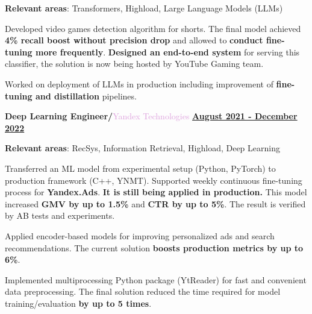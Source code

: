 \documentclass[10pt,a4paper]{report}
\begin{document}
\textbf{Relevant areas}: Transformers, Highload, Large Language Models (LLMs)

{\leftskip=3mm
    \vspace{2mm}
    
    \hspace{3mm} Developed video games detection algorithm for shorts. The final model achieved \textbf{4\% recall boost without precision drop} and allowed to \textbf{conduct fine-tuning more frequently}. \textbf{Designed an end-to-end system} for serving this classifier, the solution is now being hosted by YouTube Gaming team.
    
    \vspace{2mm}
    
    \hspace{3mm} Worked on deployment of LLMs in production including improvement of \textbf{fine-tuning and distillation} pipelines.
    
    \vspace{2mm}
}
\textbf{\large{Deep Learning Engineer/}}\textcolor{Plum}{Yandex Technologies}
\hfill
\textbf {\underline{August 2021 - December 2022}}

\textbf{Relevant areas}: RecSys, Information Retrieval, Highload, Deep Learning


{\leftskip=3mm
   
    \vspace{2mm}
    
    \hspace{3mm} Transferred an ML model from experimental setup (Python, PyTorch) to production framework (C++, YNMT).  Supported weekly continuous fine-tuning process for \textbf{Yandex.Ads}. \textbf{It is still being applied in production.} This model increased \textbf{GMV by up to 1.5\%} and \textbf{CTR by up to 5\%}. The result is verified by AB tests and experiments.
    
    \vspace{2mm}
        
    \hspace{3mm} Applied encoder-based models for improving personalized ads and search recommendations. The current solution \textbf{boosts production metrics by up to 6\%}.
    
    \vspace{2mm}
        
    \hspace{3mm} Implemented multiprocessing Python package (YtReader) for fast and convenient data preprocessing. The final solution reduced the time required for model training/evaluation \textbf{by up to 5 times}.
    
    \vspace{2mm}
}
\end{document}
